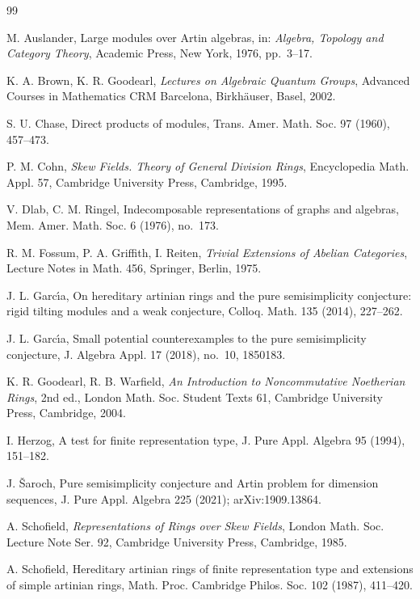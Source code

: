\documentclass[11pt,a4paper]{amsart}
\numberwithin{equation}{section}
\begin{document}
\begin{thebibliography}{99}

 M. Auslander, Large modules over Artin algebras, in: \emph{Algebra, Topology and Category Theory}, Academic Press, New York, 1976, pp.~3--17.

 K. A. Brown, K. R. Goodearl, \emph{Lectures on Algebraic Quantum Groups}, Advanced Courses in Mathematics CRM Barcelona, Birkh\"auser, Basel, 2002.

 S. U. Chase, Direct products of modules, Trans. Amer. Math. Soc. 97 (1960), 457--473.

 P. M. Cohn, \emph{Skew Fields. Theory of General Division Rings}, Encyclopedia Math. Appl. 57, Cambridge University Press, Cambridge, 1995.

 V. Dlab, C. M. Ringel, Indecomposable representations of graphs and algebras, Mem. Amer. Math. Soc. 6 (1976), no.~173.

 R. M. Fossum, P. A. Griffith, I. Reiten, \emph{Trivial Extensions of Abelian Categories}, Lecture Notes in Math. 456, Springer, Berlin, 1975.

 J. L. Garc\'{\i}a, On hereditary artinian rings and the pure semisimplicity conjecture: rigid tilting modules and a weak conjecture, Colloq. Math. 135 (2014), 227--262.

 J. L. Garc\'{\i}a, Small potential counterexamples to the pure semisimplicity conjecture, J. Algebra Appl. 17 (2018), no.~10, 1850183.

 K. R. Goodearl, R. B. Warfield, \emph{An Introduction to Noncommutative Noetherian Rings}, 2nd ed., London Math. Soc. Student Texts 61, Cambridge University Press, Cambridge, 2004.

 I. Herzog, A test for finite representation type, J. Pure Appl. Algebra 95 (1994), 151--182.

 J. \v{S}aroch, Pure semisimplicity conjecture and Artin problem for dimension sequences, J. Pure Appl. Algebra 225 (2021); arXiv:1909.13864.

 A. Schofield, \emph{Representations of Rings over Skew Fields}, London Math. Soc. Lecture Note Ser. 92, Cambridge University Press, Cambridge, 1985.

 A. Schofield, Hereditary artinian rings of finite representation type and extensions of simple artinian rings, Math. Proc. Cambridge Philos. Soc. 102 (1987), 411--420.


\end{thebibliography}
\end{document}
